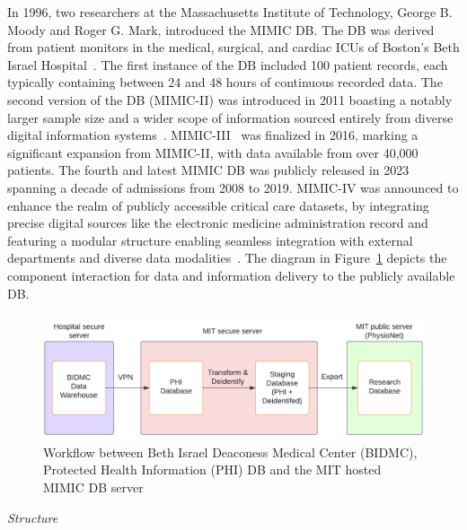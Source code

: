 In 1996, two researchers at the Massachusetts Institute of Technology, George B. Moody and Roger G. Mark, introduced the \ac{MIMIC} \ac{DB}.
The DB was derived from patient monitors in the medical, surgical, and cardiac ICUs of Boston’s Beth Israel Hospital~\cite{moodyDatabaseSupportDevelopment1996}.
The first instance of the DB included 100 patient records, each typically containing between 24 and 48 hours of continuous recorded data.
The second version of the DB (MIMIC-II) was introduced in 2011 boasting a notably larger sample size and a wider scope of information sourced entirely from diverse digital information systems~\cite{saeedMultiparameterIntelligentMonitoring2011}.
MIMIC-III~\cite{johnsonMIMICIIIFreelyAccessible2016} was finalized in 2016, marking a significant expansion from MIMIC-II, with data available from over 40,000 patients.
The fourth and latest MIMIC DB was publicly released in 2023 spanning a decade of admissions from 2008 to 2019.
MIMIC-IV was announced to enhance the realm of publicly accessible critical care datasets, by integrating precise digital sources like the electronic medicine administration record and featuring a modular structure enabling seamless integration with external departments and diverse data modalities~\cite{johnsonMIMICIVFreelyAccessible2023}.
The diagram in Figure~\ref{fig:mimic_workflow} depicts the component interaction for data and information delivery to the publicly available DB\@.

\begin{figure}[h]
    \centering
    \includegraphics[scale=0.75]{images/mimic/mimic_workflow}
    \captionsetup{format=plain, justification=raggedright}
    \caption{Workflow between Beth Israel Deaconess Medical Center (BIDMC), Protected Health Information (PHI) DB and the MIT hosted MIMIC DB server~\cite{charltonMIMICWFDBTutorials2022}}
    \label{fig:mimic_workflow}
\end{figure}

\vspace{0.4cm}
\textit{Structure}
\vspace{0.2cm}

